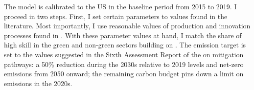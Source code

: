 
The model is calibrated to the US in the baseline period from 2015 to 2019. I proceed in two steps. First, I set certain parameters to values found in the literature. Most importantly, I use reasonable values of production and innovation processes found in \cite{Fried2018ClimateAnalysis}. %
With these parameter values at hand, I match the share of high skill in the green and non-green sectors building on \cite{Consoli2016DoCapital}. The emission target is set to the values suggested in the Sixth Assessment Report of the \cite{IPCC2022} on mitigation pathways: a 50\% reduction during the 2030s relative to 2019 levels and  net-zero emissions from 2050 onward; the remaining carbon budget pins down a limit on emissions in the 2020s.


